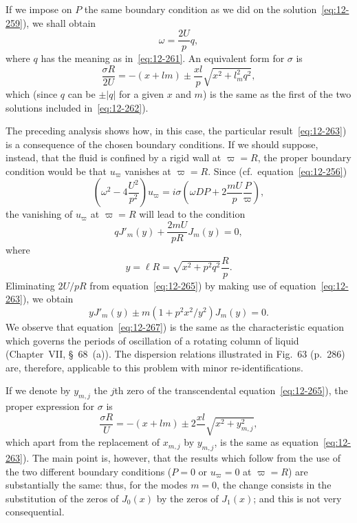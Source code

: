 If we impose on $P$ the same boundary condition as we did on the solution~\eqref{eq:12-259}), we shall obtain
\begin{equation}
\label{eq:12-262}
\omega = \frac{2U}{p}q,
\end{equation}
where $q$ has the meaning as in~\eqref{eq:12-261}. An equivalent form for $\sigma$ is
\begin{equation}
\label{eq:12-263}
\frac{\sigma R}{2U} = -\left(x+lm\right) \pm \frac{xl}{p}\sqrt{x^2+l^2_mq^2},
\end{equation}
which (since $q$ can be $\pm |q|$ for a given $x$ and $m$) is the same as the first of the two solutions included in~\eqref{eq:12-262}).

The preceding analysis shows how, in this case, the particular result~\eqref{eq:12-263}) is a consequence of the chosen boundary conditions. If we should suppose, instead, that the fluid is confined by a rigid wall at $\varpi = R$, the proper boundary condition would be that $u_\varpi$ vanishes at $\varpi = R$. Since (cf.\ equation~\eqref{eq:12-256})
\begin{equation}
\label{eq:12-264}
\left(\omega^2 - 4\frac{U^2}{p^2}\right)u_\varpi = i\sigma\left(\omega DP + 2\frac{mU}{p}\frac{P}{\varpi}\right),
\end{equation}
the vanishing of $u_\varpi$ at $\varpi = R$ will lead to the condition
\begin{equation}
\label{eq:12-265}
qJ'_m(y) + \frac{2mU}{pR}J_m(y) = 0,
\end{equation}
where
\begin{equation}
\label{eq:12-266}
y = \ell R = \sqrt{x^2 + p^2 q^2}\frac{R}{p}.
\end{equation}
Eliminating $2U/pR$ from equation~\eqref{eq:12-265}) by making use of equation~\eqref{eq:12-263}), we obtain
\begin{equation}
\label{eq:12-267}
yJ'_m(y) \pm m(1+p^2 x^2/y^2)J_m(y) = 0.
\end{equation}
We observe that equation~\eqref{eq:12-267}) is the same as the characteristic equation which governs the periods of oscillation of a rotating column of liquid (Chapter~VII, \S~68~(a)). The dispersion relations illustrated in Fig.~63 (p.~286) are, therefore, applicable to this problem with minor re-identifications.

If we denote by $y_{m,j}$ the $j$th zero of the transcendental equation~\eqref{eq:12-265}), the proper expression for $\sigma$ is
\begin{equation}
\label{eq:12-268}
\frac{\sigma R}{U} = -(x+lm) \pm 2\frac{xl}{}\sqrt{x^2+y^2_{m,j}},
\end{equation}
which apart from the replacement of $x_{m,j}$ by $y_{m,j}$, is the same as equation~\eqref{eq:12-263}). The main point is, however, that the results which follow from the use of the two different boundary conditions ($P = 0$ or $u_\varpi = 0$ at $\varpi = R$) are substantially the same: thus, for the modes $m = 0$, the change consists in the substitution of the zeros of $J_0(x)$ by the zeros of $J_1(x)$; and this is not very consequential.

